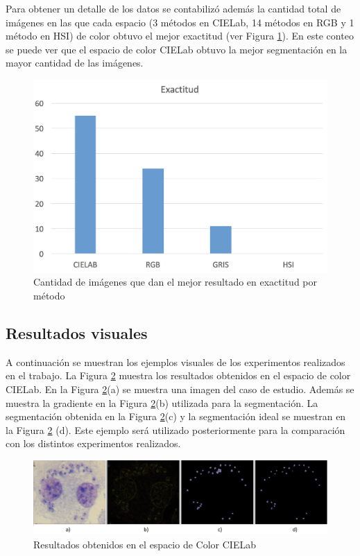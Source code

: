 Para obtener un detalle de los datos se contabilizó además la cantidad total de imágenes en las que cada espacio (3 métodos en CIELab, 14 métodos en RGB y 1 método en HSI) de color obtuvo el mejor exactitud (ver Figura \ref{exp:exactitud}). En este conteo se puede ver que el espacio de color CIELab obtuvo la mejor segmentación en la mayor cantidad de las imágenes.

\begin{figure}[h!]
\centering
\includegraphics[width=160mm]{./imagenes/exactitud.png}
\caption{Cantidad de imágenes que dan el mejor resultado en exactitud por método}
\label{exp:exactitud}
\end{figure}

\subsection{Resultados visuales}

A continuación se muestran los ejemplos visuales de los experimentos realizados en el trabajo. La Figura \ref{exp:lab} muestra los resultados obtenidos en el espacio de color CIELab. En la Figura \ref{exp:lab}(a) se muestra una imagen del caso de estudio. Además se muestra la gradiente en la Figura \ref{exp:lab}(b) utilizada para la segmentación. La segmentación obtenida en la Figura \ref{exp:lab}(c) y la segmentación ideal se muestran en la Figura \ref{exp:lab} (d). Este ejemplo será utilizado posteriormente para la comparación con los distintos experimentos realizados.

\begin{figure}[h!]
\centering
\includegraphics[width=150mm]{./imagenes/ejemplo-medialab.png}
\caption{Resultados obtenidos en el espacio de Color CIELab}
\label{exp:lab}
\end{figure}

